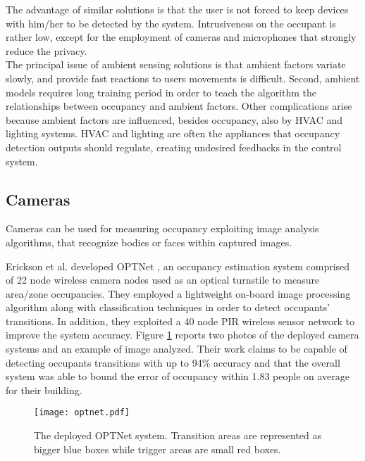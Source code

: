 \medskip
The advantage of similar solutions is that the user is not forced to keep devices with him/her to be detected by the system. Intrusiveness on the occupant is rather low, except for the employment of cameras and microphones that strongly reduce the privacy.\\
The principal issue of ambient sensing solutions is that ambient factors variate slowly, and provide fast reactions to users movements is difficult. Second, ambient models requires long training period in order to teach the algorithm the relationships between occupancy and ambient factors.
Other complications arise because ambient factors are influenced, besides occupancy, also by HVAC and lighting systems. HVAC and lighting are often the appliances that occupancy detection outputs should regulate, creating undesired feedbacks in the control system.

\subsection{Cameras}
\label{subsec:cameras}
Cameras can be used for measuring occupancy exploiting image analysis algorithms, that recognize bodies or faces within captured images.

\smallskip
Erickson et al. developed OPTNet \cite{Erickson2013}, an occupancy estimation system comprised of 22 node wireless camera nodes used as an optical turnstile to measure area/zone occupancies. They employed a lightweight on-board image processing algorithm along with classification techniques in order to detect occupants' transitions. In addition, they exploited a 40 node PIR wireless sensor network to improve the system accuracy. Figure \ref{fig:optnet} reports two photos of the deployed camera systems and an example of image analyzed. Their work claims to be capable of detecting occupants transitions with up to 94\% accuracy and that the overall system was able to bound the error of occupancy within 1.83 people on average for their building.

\begin{figure}[h!tb]
\centering
\texttt{[image: optnet.pdf]}
\caption[The deployed OPTNet system.]{The deployed OPTNet system. Transition areas are represented as bigger blue boxes while trigger areas are small red boxes.}
\label{fig:optnet}
\end{figure}

